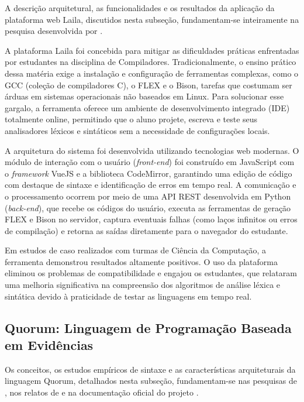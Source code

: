A descrição arquitetural, as funcionalidades e os resultados da aplicação da plataforma web Laila, discutidos nesta subseção, fundamentam-se inteiramente na pesquisa desenvolvida por .

A plataforma Laila foi concebida para mitigar as dificuldades práticas enfrentadas por estudantes na disciplina de Compiladores. Tradicionalmente, o ensino prático dessa matéria exige a instalação e configuração de ferramentas complexas, como o GCC (coleção de compiladores C), o FLEX e o Bison, tarefas que costumam ser árduas em sistemas operacionais não baseados em Linux. Para solucionar esse gargalo, a ferramenta oferece um ambiente de desenvolvimento integrado (IDE) totalmente online, permitindo que o aluno projete, escreva e teste seus analisadores léxicos e sintáticos sem a necessidade de configurações locais.

A arquitetura do sistema foi desenvolvida utilizando tecnologias web modernas. O módulo de interação com o usuário (\textit{front-end}) foi construído em JavaScript com o \textit{framework} VueJS e a biblioteca CodeMirror, garantindo uma edição de código com destaque de sintaxe e identificação de erros em tempo real. A comunicação e o processamento ocorrem por meio de uma API REST desenvolvida em Python (\textit{back-end}), que recebe os códigos do usuário, executa as ferramentas de geração FLEX e Bison no servidor, captura eventuais falhas (como laços infinitos ou erros de compilação) e retorna as saídas diretamente para o navegador do estudante.

Em estudos de caso realizados com turmas de Ciência da Computação, a ferramenta demonstrou resultados altamente positivos. O uso da plataforma eliminou os problemas de compatibilidade e engajou os estudantes, que relataram uma melhoria significativa na compreensão dos algoritmos de análise léxica e sintática devido à praticidade de testar as linguagens em tempo real.

\subsection{Quorum: Linguagem de Programação Baseada em Evidências}

Os conceitos, os estudos empíricos de sintaxe e as características arquiteturais da linguagem Quorum, detalhados nesta subseção, fundamentam-se nas pesquisas de , nos relatos de  e na documentação oficial do projeto .

